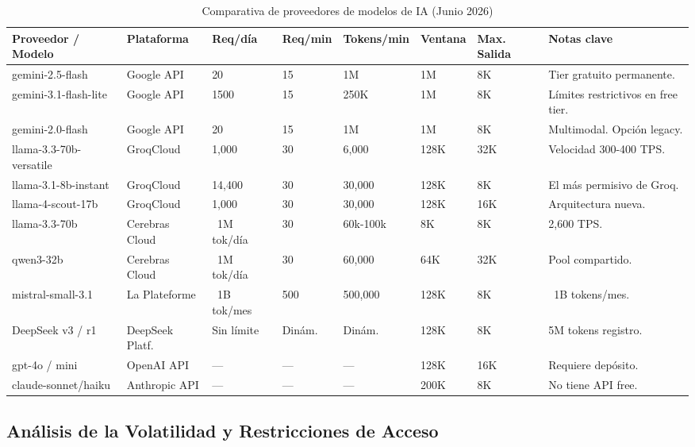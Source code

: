 \begin{table}[h]
    \centering
    \tiny
    \begin{tabularx}{\textwidth}{l l X X X X X X}
    \toprule
    \textbf{Proveedor / Modelo} & \textbf{Plataforma} & \textbf{Req/día} & \textbf{Req/min} & \textbf{Tokens/min} & \textbf{Ventana} & \textbf{Max. Salida} & \textbf{Notas clave} \\
    \midrule
    gemini-2.5-flash & Google API & 20 & 15 & 1M & 1M & 8K & Tier gratuito permanente. \\
    gemini-3.1-flash-lite & Google API & 1500 & 15 & 250K & 1M & 8K & Límites restrictivos en free tier. \\
    gemini-2.0-flash & Google API & 20 & 15 & 1M & 1M & 8K & Multimodal. Opción legacy. \\
    llama-3.3-70b-versatile & GroqCloud & 1,000 & 30 & 6,000 & 128K & 32K & Velocidad 300-400 TPS. \\
    llama-3.1-8b-instant & GroqCloud & 14,400 & 30 & 30,000 & 128K & 8K & El más permisivo de Groq. \\
    llama-4-scout-17b & GroqCloud & 1,000 & 30 & 30,000 & 128K & 16K & Arquitectura nueva. \\
    llama-3.3-70b & Cerebras Cloud & ~1M tok/día & 30 & 60k-100k & 8K & 8K & 2,600 TPS. \\
    qwen3-32b & Cerebras Cloud & ~1M tok/día & 30 & 60,000 & 64K & 32K & Pool compartido. \\
    mistral-small-3.1 & La Plateforme & ~1B tok/mes & 500 & 500,000 & 128K & 8K & ~1B tokens/mes. \\
    DeepSeek v3 / r1 & DeepSeek Platf. & Sin límite & Dinám. & Dinám. & 128K & 8K & 5M tokens registro. \\
    gpt-4o / mini & OpenAI API & — & — & — & 128K & 16K & Requiere depósito. \\
    claude-sonnet/haiku & Anthropic API & — & — & — & 200K & 8K & No tiene API free. \\
    \bottomrule
    \end{tabularx}
    \caption{Comparativa de proveedores de modelos de IA (Junio 2026)}
    \label{tab:llm-apis}
\end{table}





\subsection{ Análisis de la Volatilidad y Restricciones de Acceso}

